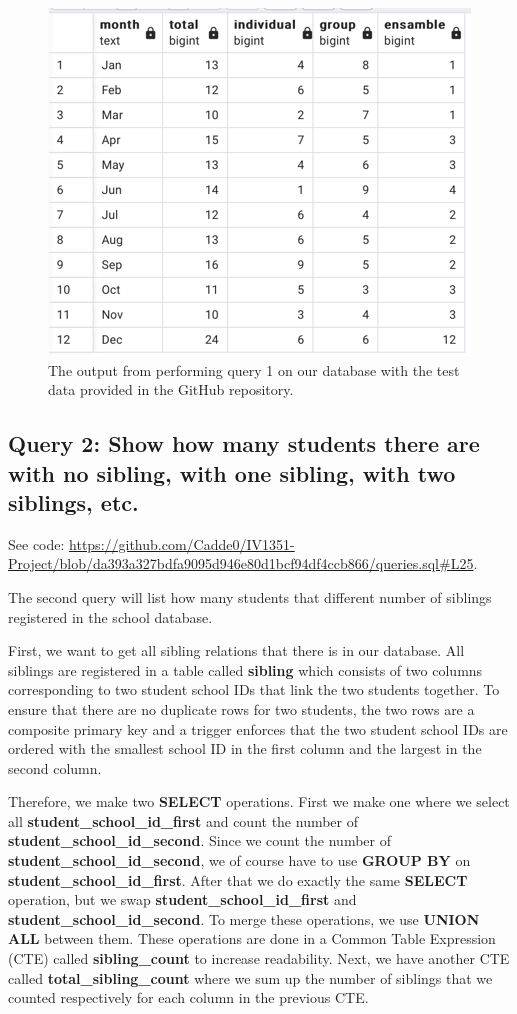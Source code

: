 \documentclass[a4paper]{scrartcl}
\begin{document}
\begin{figure}[H]
    \begin{center}
      \includegraphics[scale=0.6]{query1_output.png}
      \caption{The output from performing query 1 on our database with the test data provided in the GitHub repository.}
      \label{fig:diag}
    \end{center}
  \end{figure}


\subsection{Query 2: Show how many students there are with no sibling, with one sibling, with two siblings, etc.}
See code: \url{https://github.com/Cadde0/IV1351-Project/blob/da393a327bdfa9095d946e80d1bcf94df4ccb866/queries.sql#L25}.

The second query will list how many students that different number of siblings registered in the school database.

First, we want to get all sibling relations that there is in our database. All siblings are registered in a table called \textbf{sibling} which consists of two columns corresponding to two student school IDs that link the two students together. To ensure that there are no duplicate rows for two students, the two rows are a composite primary key and a trigger enforces that the two student school IDs are ordered with the smallest school ID in the first column and the largest in the second column.

Therefore, we make two \textbf{SELECT} operations. First we make one where we select all \textbf{student\_school\_id\_first} and count the number of \textbf{student\_school\_id\_second}. Since we count the number of \textbf{student\_school\_id\_second}, we of course have to use \textbf{GROUP BY} on \textbf{student\_school\_id\_first}. After that we do exactly the same \textbf{SELECT} operation, but we swap \textbf{student\_school\_id\_first} and \textbf{student\_school\_id\_second}. To merge these operations, we use \textbf{UNION ALL} between them. These operations are done in a Common Table Expression (CTE) called \textbf{sibling\_count} to increase readability. Next, we have another CTE called \textbf{total\_sibling\_count} where we sum up the number of siblings that we counted respectively for each column in the previous CTE.
\end{document}
